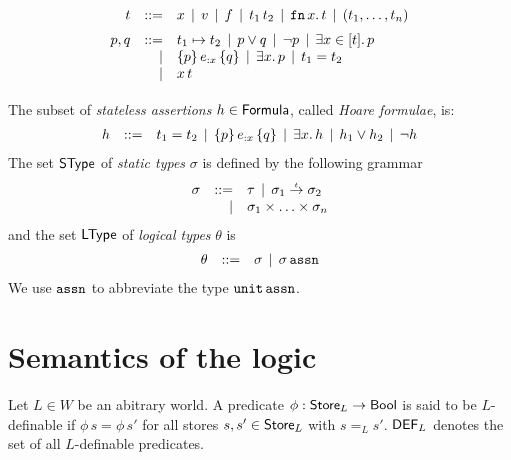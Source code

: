 \documentclass[12pt,a4paper]{report}
\newcommand{\ssto}{\nstyle{sto}}
\newcommand{\DEF}{\sstyle{DEF}}
\begin{document}
\[\GRbeg
  t \GRis x \GRmid v \GRmid f \GRmid \app{t_1}{t_2} \GRmid \tabstr{x}{t} \GRmid (t_1,\ldots,t_n)
    \GRnl

  p,q \GRis t_1 \mapsto t_2 \GRmid p \vee q \GRmid \neg p \GRmid \qbex{x}{t}{p}
      \GRal \triple{p}{e_{:x}}{q} \GRmid \qex{x}{p} \GRmid t_1 = t_2
      \GRal x\,t
      \GRnl
\GRend\]
The subset of {\em stateless assertions} $h \in \mathsf{Formula}$, called {\em Hoare formulae}, is:
\[\begin{array}{rrlll}
  h & ::= & t_1 = t_2 \,\mid\, \{p\}\,e_{:x}\,\{q\} \,\mid\, \exists{x}.\,{h} \,\mid\, h_1 \vee h_2 \,\mid\, \neg h
\end{array}\]
The set $\mathsf{SType}$ of {\em static types} $\sigma$ is defined by the following grammar
\[\begin{array}{rrlll}
  \sigma & ::= & \tau \,\mid\, \sigma_1\stackrel{_t}{\to}\sigma_2
  \\ & \mid & \sigma_1 \times \ldots \times \sigma_n
\end{array}\]
and the set $\mathsf{LType}$ of {\em logical types} $\theta$ is
\[\begin{array}{rrlll}
  \theta & ::= & \sigma \,\mid\, \sigma\,\mathtt{assn}
\end{array}\]
We use $\mathtt{assn}$ to abbreviate the type $\mathtt{unit}\,\mathtt{assn}$.



\section{Semantics of the logic}

\begin{definition}[$L$-definability]
  Let $L\in W$ be an abitrary world. A predicate $\phi : \mathsf{Store}_L \to \mathsf{Bool}$ is said to be $L$-definable
  if $\phi\,s = \phi\,s'$ for all stores $s,s' \in \mathsf{Store}_L$ with $s =_L s'$. $\DEF_L$ denotes the set of
  all $L$-definable predicates.
\end{definition}


\end{document}
